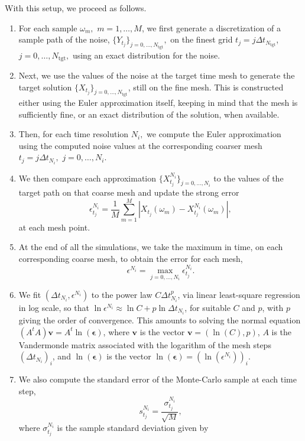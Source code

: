 \documentclass[reqno,12pt]{amsart}
\theoremstyle{plain} %
\theoremstyle{definition} %
\begin{document}
With this setup, we proceed as follows.
\begin{enumerate}
    \item For each sample $\omega_m,$ $m=1, \ldots, M$, we first generate a discretization of a sample path of the noise, $\{Y_{t_j}\}_{j=0, \ldots, N_{\mathrm{tgt}}},$ on the finest grid $t_j = j \Delta t_{N_{\textrm{tgt}}}$, $j = 0, \ldots, N_{\mathrm{tgt}},$ using an exact distribution for the noise.
    \item Next, we use the values of the noise at the target time mesh to generate the target solution $\{X_{t_j}\}_{j=0, \ldots, N_{\mathrm{tgt}}}$, still on the fine mesh. This is constructed either using the Euler approximation itself, keeping in mind that the mesh is sufficiently fine, or an exact distribution of the solution, when available.
    \item Then, for each time resolution $N_i,$ we compute the Euler approximation using the computed noise values at the corresponding coarser mesh $t_j = j\Delta t_{N_i},$ $j=0, \ldots, N_i.$
    \item We then compare each approximation $\{X_{t_j}^{N_i}\}_{j=0, \ldots, N_i}$ to the values of the target path on that coarse mesh and update the strong error
    \[
        \epsilon_{t_j}^{N_i} = \frac{1}{M}\sum_{m=1}^M \left|X_{t_j}(\omega_m) - X_{t_j}^{N_i}(\omega_m)\right|,
    \]
    at each mesh point.
    \item At the end of all the simulations, we take the maximum in time, on each corresponding coarse mesh, to obtain the error for each mesh,
    \[
        \epsilon^{N_i} = \max_{j=0, \ldots, N_i} \epsilon_{t_j}^{N_i}.
    \]
    \item We fit $(\Delta t_{N_i}, \epsilon^{N_i})$ to the power law $C\Delta t_{N_i}^p$, via linear least-square regression in log scale, so that $\ln \epsilon^{N_i} \approx \ln C + p \ln \Delta t_{N_i}$, for suitable $C$ and $p$, with $p$ giving the order of convergence. This amounts to solving the normal equation $(A^tA)\mathbf{v} = A^t\ln(\boldsymbol{\epsilon})$, where $\mathbf{v}$ is the vector $\mathbf{v} = (\ln(C), p)$, $A$ is the Vandermonde matrix associated with the logarithm of the mesh steps $(\Delta t_{N_i})_i$, and $\ln(\boldsymbol{\epsilon})$ is the vector $\ln(\boldsymbol{\epsilon}) = (\ln(\epsilon^{N_i}))_i$.
    \item We also compute the standard error of the Monte-Carlo sample at each time step,
    \[
        s_{t_j}^{N_i} = \frac{\sigma_{t_j}^{N_i}}{\sqrt{M}},
    \]
    where $\sigma_{t_j}^{N_i}$ is the sample standard deviation given by

\end{enumerate}
\end{document}
